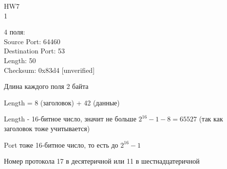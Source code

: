 \documentclass[a4paper,11pt]{article}
\begin{document}
\Large
HW7
\\
1

\begin{center}
\label{fig:image}
\end{center}
4 поля:\\
Source Port: 64460\\
Destination Port: 53\\
Length: 50\\
Checksum: 0x83d4 [unverified]

Длина каждого поля 2 байта

Length = 8 (заголовок) + 42 (данные)

Length - 16-битное число, значит не больше $2^{16} - 1 - 8 = 65527$ (так как заголовок тоже учитывается)

Port тоже 16-битное число, то есть до $2^{16} - 1$

\begin{center}
\label{fig:image}
\end{center}
Номер протокола 17 в десятеричной или 11 в шестнадцатеричной
\end{document}
